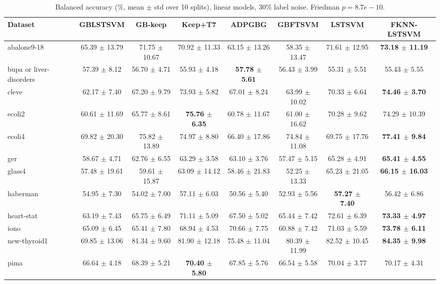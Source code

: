 \begin{table}[t]
\centering\small
\caption{Balanced accuracy (\%, mean $\pm$ std over 10 splits), linear models, 30\% label noise. Friedman $p = 8.7e-10$.}
\begin{tabular}{lccccccc}
\toprule
Dataset & GBLSTSVM & GB-keep & Keep+T7 & ADPGBG & GBFTSVM & LSTSVM & FKNN-LSTSVM \\
\midrule
abalone9-18 & 65.39 $\pm$ 13.79 & 71.75 $\pm$ 10.67 & 70.92 $\pm$ 11.33 & 63.15 $\pm$ 13.26 & 58.35 $\pm$ 13.47 & 71.61 $\pm$ 12.95 & \textbf{73.18 $\pm$ 11.19} \\
bupa or liver-disorders & 57.39 $\pm$ 8.12 & 56.70 $\pm$ 4.71 & 55.93 $\pm$ 4.18 & \textbf{57.78 $\pm$ 5.61} & 56.43 $\pm$ 3.99 & 55.31 $\pm$ 5.51 & 55.43 $\pm$ 5.55 \\
cleve & 62.17 $\pm$ 7.40 & 67.20 $\pm$ 9.79 & 73.93 $\pm$ 5.82 & 67.01 $\pm$ 8.24 & 63.99 $\pm$ 10.02 & 70.33 $\pm$ 6.64 & \textbf{74.46 $\pm$ 3.70} \\
ecoli2 & 60.61 $\pm$ 11.69 & 65.77 $\pm$ 8.61 & \textbf{75.76 $\pm$ 6.35} & 60.78 $\pm$ 11.67 & 61.00 $\pm$ 16.62 & 70.28 $\pm$ 9.62 & 74.29 $\pm$ 10.39 \\
ecoli4 & 69.82 $\pm$ 20.30 & 75.82 $\pm$ 13.89 & 74.97 $\pm$ 8.80 & 66.40 $\pm$ 17.86 & 74.84 $\pm$ 11.08 & 69.75 $\pm$ 17.76 & \textbf{77.41 $\pm$ 9.84} \\
ger & 58.67 $\pm$ 4.71 & 62.76 $\pm$ 6.55 & 63.29 $\pm$ 3.58 & 63.10 $\pm$ 3.76 & 57.47 $\pm$ 5.15 & 65.28 $\pm$ 4.91 & \textbf{65.41 $\pm$ 4.55} \\
glass4 & 57.48 $\pm$ 19.61 & 59.61 $\pm$ 15.87 & 63.09 $\pm$ 14.12 & 58.46 $\pm$ 21.83 & 52.25 $\pm$ 13.33 & 65.23 $\pm$ 21.05 & \textbf{66.15 $\pm$ 16.03} \\
haberman & 54.95 $\pm$ 7.30 & 54.02 $\pm$ 7.00 & 57.11 $\pm$ 6.03 & 50.56 $\pm$ 5.40 & 52.93 $\pm$ 5.56 & \textbf{57.27 $\pm$ 7.40} & 56.42 $\pm$ 6.86 \\
heart-stat & 63.19 $\pm$ 7.43 & 65.75 $\pm$ 6.49 & 71.11 $\pm$ 5.09 & 67.50 $\pm$ 5.02 & 65.44 $\pm$ 7.42 & 72.61 $\pm$ 6.39 & \textbf{73.33 $\pm$ 4.97} \\
iono & 65.09 $\pm$ 6.45 & 65.41 $\pm$ 7.80 & 68.94 $\pm$ 4.53 & 70.66 $\pm$ 7.75 & 60.88 $\pm$ 7.42 & 71.03 $\pm$ 5.59 & \textbf{73.78 $\pm$ 6.11} \\
new-thyroid1 & 69.85 $\pm$ 13.06 & 81.34 $\pm$ 9.60 & 81.90 $\pm$ 12.18 & 75.48 $\pm$ 11.04 & 80.39 $\pm$ 11.99 & 82.52 $\pm$ 10.45 & \textbf{84.35 $\pm$ 9.98} \\
pima & 66.64 $\pm$ 4.18 & 68.39 $\pm$ 5.21 & \textbf{70.40 $\pm$ 5.80} & 67.85 $\pm$ 5.76 & 66.54 $\pm$ 5.58 & 70.04 $\pm$ 3.77 & 70.17 $\pm$ 4.31 \\

\end{tabular}
\end{table}

